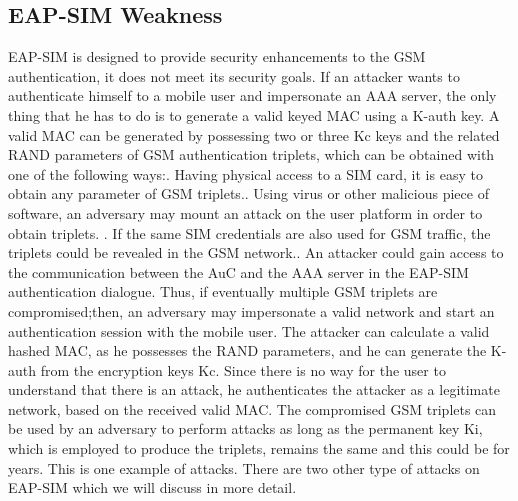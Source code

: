 \subsection{EAP-SIM Weakness}
EAP-SIM is designed to provide security enhancements to the GSM authentication, it does not meet its
security goals. If an attacker wants to authenticate himself to a mobile user and impersonate an AAA server, the only thing that he has to do is to generate a valid keyed MAC using a K-auth key. A valid MAC can be generated by possessing two or three Kc keys and the related RAND parameters of GSM authentication triplets, which can be obtained with one of the following ways:. Having physical access to a SIM card, it is easy to obtain any parameter of GSM triplets.. Using virus or other malicious piece of software, an adversary may mount an attack on the user platform in
order to obtain triplets. . If the same SIM credentials are also used for GSM traffic, the triplets could be revealed in the GSM network.. An attacker could gain access to the communication between the AuC and the AAA server in the EAP-SIM
authentication dialogue. \newline
Thus, if eventually multiple GSM triplets are compromised;then, an adversary may impersonate a valid network and start an authentication session with the mobile user. The attacker can calculate a valid hashed MAC, as he possesses the RAND parameters, and he can generate the K-auth from the encryption keys Kc. Since there is no way for the user to understand that there is an attack, he authenticates the attacker as a legitimate network, based on the received valid MAC.
The compromised GSM triplets can be used by an adversary to perform attacks as long as the permanent key Ki, which is employed to produce the triplets, remains the same and this could be for years. This is one example of attacks. 
There are two other type of attacks on EAP-SIM which we will discuss in more detail. 
